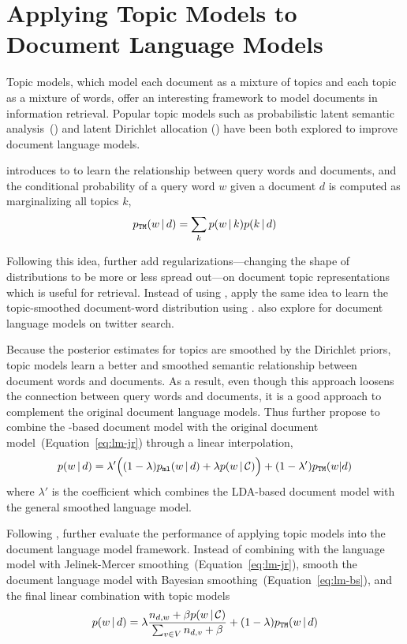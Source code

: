\section{Applying Topic Models to Document Language Models}

Topic models, which model each document as a mixture of topics and
each topic as a mixture of words, offer an interesting framework to
model documents in information retrieval. Popular topic models such as
probabilistic latent semantic analysis~(\plsa{}) and latent Dirichlet allocation ()
have been both explored to improve document language models.

\citet{hofmann-99a} introduces \plsa{} to
to learn the relationship between query words and documents,
and the conditional probability of a query word $w$ given a document $d$ is
computed as marginalizing all topics $k$,
\begin{align}
p_{\texttt{TM}}(w \, | \, d) = \sum_{k} p(w \, | \, k) p(k \, | \, d)
\end{align}

Following this idea, \citet{Wang-2013} further add
regularizations---changing the shape of distributions to be more or
less spread out---on document topic representations 
which is useful for retrieval. Instead of using \plsa{}, \citet{wei-06} apply the same idea to 
learn the topic-smoothed document-word distribution using .
\citet{Vosecky-2014} also explore  for document language models on  twitter search.

Because the posterior estimates for topics are smoothed by the Dirichlet priors, topic models learn a better and
smoothed semantic relationship between document words and documents. As a result,
even though this approach loosens the connection between query words and documents,
it is a good approach to complement the original document language models. 
Thus \citet{wei-06} further propose to combine the
-based document model with the original document
model~(Equation~\ref{eq:lm-jr}) through a linear interpolation,
\begin{align}
p(w \, | \, d) = \lambda' \Big( (1 - \lambda) p_{\texttt{ml}}(w \, | \, d) + \lambda
p(w \, | \, \mathcal{C}) \Big) + (1 - \lambda') p_{\texttt{TM}}(w|d)
\end{align}
where $\lambda'$ is the coefficient which combines the LDA-based
document model with the general smoothed language model.

Following \citet{wei-06}, \citet{Lu-2011} further evaluate the
performance of applying topic models into the document language model
framework. Instead of combining with the language model with
Jelinek-Mercer smoothing~(Equation~\ref{eq:lm-jr}), \citet{Lu-2011}
smooth the document language model with Bayesian
smoothing~(Equation~\ref{eq:lm-bs}), and the final linear combination
with topic models
\begin{align}
p(w \, | \, d) = \lambda \frac{n_{d,w} + \beta p(w \, | \, \mathcal{C})}{\sum_{v
  \in V} n_{d,v} + \beta}  + (1 - \lambda) p_{\texttt{TM}}(w \, | \, d)
\end{align}

